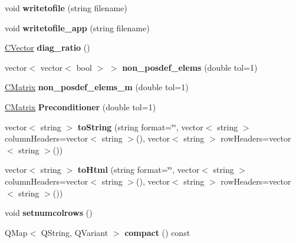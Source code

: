 \begin{DoxyCompactItemize}
\mbox{\label{class_c_matrix_ae70567149b43be9ada081dea7340f06e}} 
void {\bfseries writetofile} (string filename)
\item 
\mbox{\label{class_c_matrix_a092c1e795ad7e298863742f013997538}} 
void {\bfseries writetofile\+\_\+app} (string filename)
\item 
\mbox{\label{class_c_matrix_a845b93c40a8af80bd93ddcf3ddd2f043}} 
\hyperlink{class_c_vector}{C\+Vector} {\bfseries diag\+\_\+ratio} ()
\item 
\mbox{\label{class_c_matrix_a943b8d6685ef7d29dde4afb92dea15c2}} 
vector$<$ vector$<$ bool $>$ $>$ {\bfseries non\+\_\+posdef\+\_\+elems} (double tol=1)
\item 
\mbox{\label{class_c_matrix_a2f4e5ea181fc1280e6a4d1a403c2ac62}} 
\hyperlink{class_c_matrix}{C\+Matrix} {\bfseries non\+\_\+posdef\+\_\+elems\+\_\+m} (double tol=1)
\item 
\mbox{\label{class_c_matrix_aee8707014ca14d446143b4c4501ff547}} 
\hyperlink{class_c_matrix}{C\+Matrix} {\bfseries Preconditioner} (double tol=1)
\item 
\mbox{\label{class_c_matrix_a65ade29d1230c6fdcc54e44961534d71}} 
vector$<$ string $>$ {\bfseries to\+String} (string format=\char`\"{}\char`\"{}, vector$<$ string $>$ column\+Headers=vector$<$ string $>$(), vector$<$ string $>$ row\+Headers=vector$<$ string $>$())
\item 
\mbox{\label{class_c_matrix_aeebca9409790c688d39155c072280879}} 
vector$<$ string $>$ {\bfseries to\+Html} (string format=\char`\"{}\char`\"{}, vector$<$ string $>$ column\+Headers=vector$<$ string $>$(), vector$<$ string $>$ row\+Headers=vector$<$ string $>$())
\item 
\mbox{\label{class_c_matrix_a25523aea9e604e92efacfd6f41451114}} 
void {\bfseries setnumcolrows} ()
\item 
\mbox{\label{class_c_matrix_a6f3f4a85ac83d266cdf082598ea14e8a}} 
Q\+Map$<$ Q\+String, Q\+Variant $>$ {\bfseries compact} () const
\end{DoxyCompactItemize}
